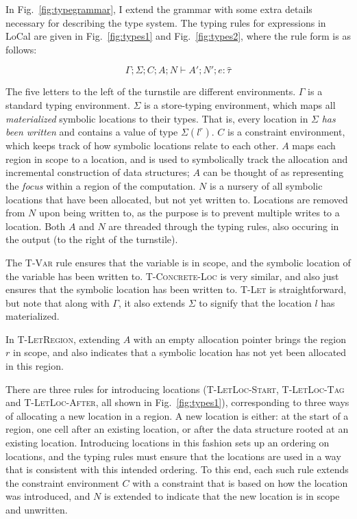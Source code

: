 \documentclass[showabstract,showacknowledgments,showpreface,showdedication,school]{iuphd}
\theoremstyle{nonumberplain}
\newcommand{\sysname}[0]{LoCal\xspace}
\newcommand{\ourcalc}[0]{\sysname}
\newcommand{\keywd}[1]{\mathit{#1}}
\newcommand{\skeywd}[1]{\mathit{#1}}
\newcommand{\EXPR}{\keywd{e}}
\newcommand{\hTYP}{\keywd{\hat{\tau}}}
\newcommand{\loc}{\skeywd{l}}
\newcommand{\reg}{\skeywd{r}}
\newcommand{\CENV}{\keywd{C}}
\newcommand{\TENV}{\keywd{\Gamma}}
\newcommand{\SENV}{\keywd{\Sigma}}
\newcommand{\AENV}{\keywd{A}}
\newcommand{\NENV}{\keywd{N}}
\newcommand{\tllafter}{T-LetLoc-After}
\newcommand{\tlltag}{T-LetLoc-Tag}
\newcommand{\tllstart}{T-LetLoc-Start}
\newcommand{\tlregion}{T-LetRegion}
\newcommand{\tvar}{T-Var}
\newcommand{\tlet}{T-Let}
\newcommand{\tconcreteloc}{T-Concrete-Loc}
\newcommand{\Figref}[1]{Fig.~\ref{#1}}
\newcommand{\figref}[1]{Fig.~\ref{#1}}
\begin{document}
In \figref{fig:typegrammar}, I extend the grammar with some extra
details necessary for describing the type system.
The typing rules for expressions in \ourcalc{} are given in
\figref{fig:types1} and \figref{fig:types2}, where the rule form is as follows:

\[ \TENV;\SENV;\CENV;\AENV;\NENV \vdash \AENV'; \NENV'; \EXPR : \hTYP \]


The five letters to the left of the turnstile are different environments.
$\TENV$ is a standard typing environment.
$\SENV$ is a store-typing environment, which maps all
\emph{materialized} symbolic
locations to their types. That is, every location in $\SENV$ {\em has been written}
and contains a value of type $\SENV(l^r)$.
$\CENV$ is a constraint environment, which keeps
track of how symbolic locations relate to each other.
$\AENV$ maps each region in scope to a location, and is used to symbolically
track the allocation and incremental construction of data structures;
$\AENV$ can be thought of as representing the
\emph{focus} within a region of the computation.
$\NENV$ is a nursery of all symbolic locations that have been allocated,
but not yet written to.
Locations are removed from $\NENV$
upon being written to, as the purpose is to prevent multiple writes to
a location.
Both $\AENV$ and $\NENV$ are threaded through the typing
rules, also occuring in the output (to the right of the
turnstile).


The \textsc{\tvar} rule ensures that the variable is in scope, and
the symbolic location of the variable has been written to.
\textsc{\tconcreteloc} is very similar, and also just ensures that
the symbolic location has been written to.
\textsc{\tlet} is straightforward, but note that along with $\TENV$,
it also extends $\SENV$ to signify that the location $\loc$ has
materialized.

In \textsc{\tlregion}, extending $\AENV$ with an empty allocation pointer
brings the region $\reg$ in scope, and also indicates that
a symbolic location has not yet been allocated in this region.

There are three rules for introducing locations
(\textsc{\tllstart}, \textsc{\tlltag} and \textsc{\tllafter}, all shown in \Figref{fig:types1}),
corresponding to three ways of allocating a new location in a
region. A new location is either: at the start of a region, one cell
after an existing location, or after the data structure rooted at an
existing location. Introducing locations in this fashion sets up an
ordering on locations, and the typing rules must ensure that the
locations are used in a way that is consistent with this intended
ordering.
To this end, each such rule extends the constraint environment $\CENV$
with a constraint that is based on how the location was introduced,
and $\NENV$ is extended to indicate that the new location is in scope
and unwritten.
\end{document}
